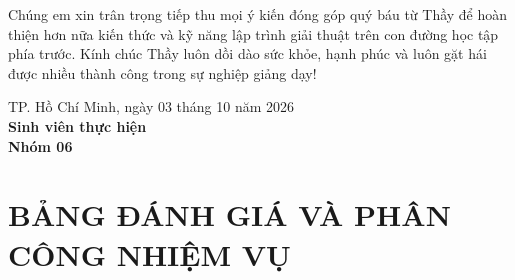 \documentclass[14pt,a4paper]{extarticle}
\begin{document}
Chúng em xin trân trọng tiếp thu mọi ý kiến đóng góp quý báu từ Thầy để hoàn thiện hơn nữa kiến thức và kỹ năng lập trình giải thuật trên con đường học tập phía trước. Kính chúc Thầy luôn dồi dào sức khỏe, hạnh phúc và luôn gặt hái được nhiều thành công trong sự nghiệp giảng dạy!

\vspace{1.0cm}
\begin{flushright}
    TP. Hồ Chí Minh, ngày 03 tháng 10 năm 2026\\[0.2cm]
    \textbf{Sinh viên thực hiện}\\[0.2cm]
    \textbf{Nhóm 06}
\end{flushright}

\newpage
\thispagestyle{empty}
\begingroup
\titlespacing*{\section}{0pt}{0pt}{4pt}
\section*{BẢNG ĐÁNH GIÁ VÀ PHÂN CÔNG NHIỆM VỤ}
\end{document}
